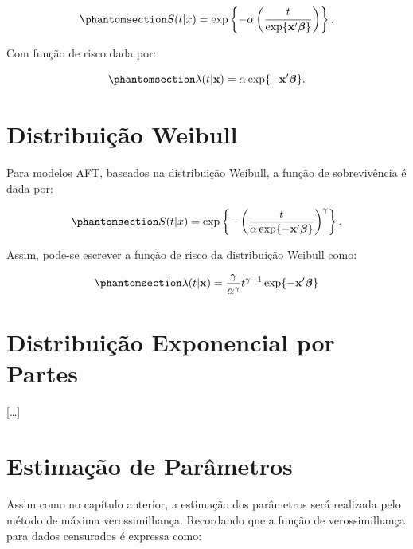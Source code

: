 \documentclass[
  12pt,
  letterpaper,
  DIV=11,
  numbers=noendperiod]{scrreprt}
\begin{document}
\begin{equation}\phantomsection\label{eq-AFTexpSt}{
S (t | x) = \exp \left\{- \alpha \left( \dfrac{t}{\exp\{ \mathbf{x'} \boldsymbol{\beta} \}} \right) \right\}.
}\end{equation}

Com função de risco dada por:

\begin{equation}\phantomsection\label{eq-AFTexpht}{
\lambda(t | \mathbf{x}) = \alpha \exp\{ - \mathbf{x'} \boldsymbol{\beta} \}.
}\end{equation}

\section{Distribuição Weibull}\label{distribuiuxe7uxe3o-weibull-1}

Para modelos AFT, baseados na distribuição Weibull, a função de
sobrevivência é dada por:

\begin{equation}\phantomsection\label{eq-AFTweibSt}{
S (t | x) = \exp \left\{ - \left( \dfrac{t}{\alpha \exp\{ - \mathbf{x'} \boldsymbol{\beta} \} } \right)^{\gamma} \right\}.
}\end{equation}

Assim, pode-se escrever a função de risco da distribuição Weibull como:

\begin{equation}\phantomsection\label{eq-AFTeeibht}{
\lambda(t | \mathbf{x}) = \dfrac{ \gamma }{ \alpha^{\gamma} } t^{\gamma - 1} \exp\{ - \mathbf{x'} \boldsymbol{\beta} \}
}\end{equation}

\section{Distribuição Exponencial por
Partes}\label{distribuiuxe7uxe3o-exponencial-por-partes}

{[}\ldots{]}

\section{Estimação de
Parâmetros}\label{estimauxe7uxe3o-de-paruxe2metros-1}

Assim como no capítulo anterior, a estimação dos parâmetros será
realizada pelo método de máxima verossimilhança. Recordando que a função
de verossimilhança para dados censurados é expressa como:
\end{document}
